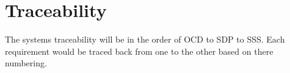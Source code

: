 
\chapter{Traceability}
\label{loc:Traceability}

The systems traceability will be in the order of OCD to SDP to SSS. Each requirement would be traced back from one to the other based on there numbering.
